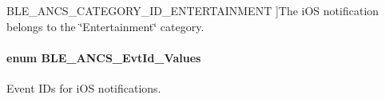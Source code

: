 \begin{Desc}
\begin{description}
{B\+L\+E\+\_\+\+A\+N\+C\+S\+\_\+\+C\+A\+T\+E\+G\+O\+R\+Y\+\_\+\+I\+D\+\_\+\+E\+N\+T\+E\+R\+T\+A\+I\+N\+M\+E\+NT\hypertarget{group___b_l_e___a_n_c_s_gga982bbd8a00c6ecff960d5196576dbba0aff63bf0a7eb05e2609b434244353bfa5}{}\label{group___b_l_e___a_n_c_s_gga982bbd8a00c6ecff960d5196576dbba0aff63bf0a7eb05e2609b434244353bfa5}
}]The i\+OS notification belongs to the \char`\"{}\+Entertainment\char`\"{} category. \end{description}
\end{Desc}
\paragraph[{\texorpdfstring{B\+L\+E\+\_\+\+A\+N\+C\+S\+\_\+\+Evt\+Id\+\_\+\+Values}{BLE_ANCS_EvtId_Values}}]{\setlength{\rightskip}{0pt plus 5cm}enum {\bf B\+L\+E\+\_\+\+A\+N\+C\+S\+\_\+\+Evt\+Id\+\_\+\+Values}}\hypertarget{group___b_l_e___a_n_c_s_gaf8fe466493239548694a1a439f5b8bc0}{}\label{group___b_l_e___a_n_c_s_gaf8fe466493239548694a1a439f5b8bc0}


Event I\+Ds for i\+OS notifications. 

